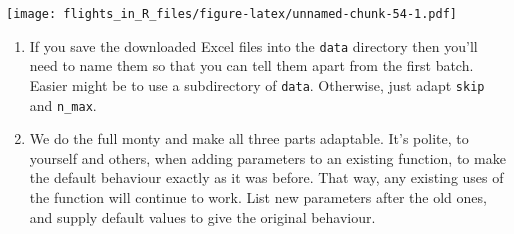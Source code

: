 \documentclass[
]{book}
\providecommand{\tightlist}{%
  \setlength{\itemsep}{0pt}\setlength{\parskip}{0pt}}
\begin{document}
\texttt{[image: flights\_in\_R\_files/figure-latex/unnamed-chunk-54-1.pdf]}

\begin{enumerate}
\def\labelenumi{\arabic{enumi})}
\setcounter{enumi}{9}
\tightlist
\item
  If you save the downloaded Excel files into the \texttt{data} directory then you'll need to name them so that you can tell them apart from the first batch. Easier might be to use a subdirectory of \texttt{data}. Otherwise, just adapt \texttt{skip} and \texttt{n\_max}.
\item
  We do the full monty and make all three parts adaptable. It's polite, to yourself and others, when adding parameters to an existing function, to make the default behaviour exactly as it was before. That way, any existing uses of the function will continue to work. List new parameters after the old ones, and supply default values to give the original behaviour.
\end{enumerate}
\end{document}
